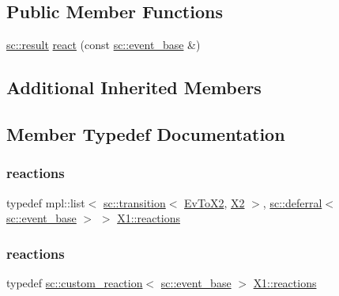 \subsection*{Public Member Functions}
\begin{DoxyCompactItemize}
\item 
\mbox{\hyperlink{namespaceboost_1_1statechart_abe807f6598b614d6d87bb951ecd92331}{sc\+::result}} \mbox{\hyperlink{struct_x1_a23e285378cd818ce69280830ca220079}{react}} (const \mbox{\hyperlink{classboost_1_1statechart_1_1event__base}{sc\+::event\+\_\+base}} \&)
\end{DoxyCompactItemize}
\subsection*{Additional Inherited Members}


\subsection{Member Typedef Documentation}
\mbox{\label{struct_x1_aedd9c3baf74e22a2cce853b8d6e7cd02}} 
\subsubsection{\texorpdfstring{reactions}{reactions}\hspace{0.1cm}{\footnotesize\ttfamily [1/3]}}
{\footnotesize\ttfamily typedef mpl\+::list$<$ \mbox{\hyperlink{classboost_1_1statechart_1_1transition}{sc\+::transition}}$<$ \mbox{\hyperlink{struct_ev_to_x2}{Ev\+To\+X2}}, \mbox{\hyperlink{struct_x2}{X2}} $>$, \mbox{\hyperlink{classboost_1_1statechart_1_1deferral}{sc\+::deferral}}$<$ \mbox{\hyperlink{classboost_1_1statechart_1_1event__base}{sc\+::event\+\_\+base}} $>$ $>$ \mbox{\hyperlink{struct_x1_ab14c7f72d0b9d16885940a5e36752fa6}{X1\+::reactions}}}

\mbox{\label{struct_x1_ab14c7f72d0b9d16885940a5e36752fa6}} 
\subsubsection{\texorpdfstring{reactions}{reactions}\hspace{0.1cm}{\footnotesize\ttfamily [2/3]}}
{\footnotesize\ttfamily typedef \mbox{\hyperlink{classboost_1_1statechart_1_1custom__reaction}{sc\+::custom\+\_\+reaction}}$<$ \mbox{\hyperlink{classboost_1_1statechart_1_1event__base}{sc\+::event\+\_\+base}} $>$ \mbox{\hyperlink{struct_x1_ab14c7f72d0b9d16885940a5e36752fa6}{X1\+::reactions}}}

